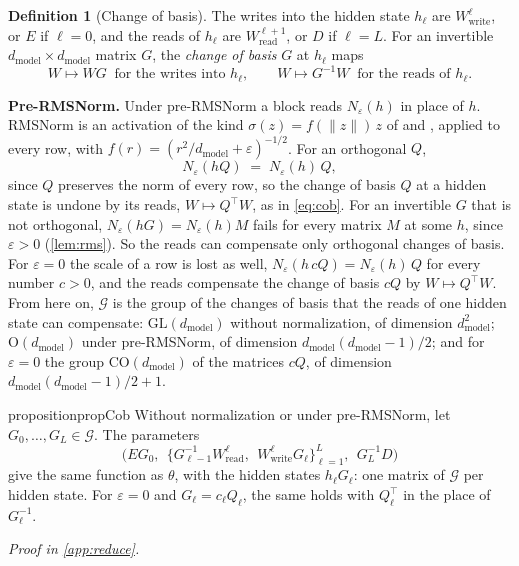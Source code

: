 \documentclass[10pt]{article}
\theoremstyle{definition}
\newtheorem{definition}[theorem]{Definition}
\theoremstyle{remark}
\newcommand{\Wread}{W_{\mathrm{read}}}
\newcommand{\Wwrite}{W_{\mathrm{write}}}
\newcommand{\dm}{d_{\mathrm{model}}}
\newcommand{\GL}{\mathrm{GL}}
\newcommand{\Ort}{\mathrm{O}}
\newcommand{\CO}{\mathrm{CO}}
\newcommand{\G}{\mathcal{G}}
\newcommand{\norm}[1]{\lVert #1\rVert}
\newcommand{\para}[1]{\smallskip\noindent\textbf{#1}\hspace{0.5em}}
\newcommand{\proofin}[1]{\par\vspace{-0.4\baselineskip}\noindent\hfill{\small\itshape Proof in \cref{#1}.}\par\smallskip}
\begin{document}
\begin{definition}[Change of basis]\label{def:cob}
The writes into the hidden state $h_\ell$ are $\Wwrite^{\ell}$, or $E$ if $\ell = 0$, and the reads of $h_\ell$ are $\Wread^{\ell+1}$, or $D$ if $\ell = L$. For an invertible $\dm\times\dm$ matrix $G$, the \emph{change of basis} $G$ at $h_\ell$ maps
\begin{equation}\label{eq:cob}
W \mapsto WG \ \text{ for the writes into } h_\ell, \qquad W \mapsto G^{-1}W \ \text{ for the reads of } h_\ell.
\end{equation}
\end{definition}

\para{Pre-RMSNorm.} Under pre-RMSNorm a block reads $N_\varepsilon(h)$ in place of $h$. RMSNorm is an activation of the kind $\sigma(z) = f(\norm{z})\,z$ of \citet{ganev2021universal} and \citet{zhao2023symmetries}, applied to every row, with $f(r) = (r^2/\dm + \varepsilon)^{-1/2}$. For an orthogonal $Q$,
\[
N_\varepsilon(hQ) \;=\; N_\varepsilon(h)\,Q ,
\]
since $Q$ preserves the norm of every row, so the change of basis $Q$ at a hidden state is undone by its reads, $W \mapsto Q^\top W$, as in \eqref{eq:cob}. For an invertible $G$ that is not orthogonal, $N_\varepsilon(hG) = N_\varepsilon(h)M$ fails for every matrix $M$ at some $h$, since $\varepsilon > 0$ (\cref{lem:rms}). So the reads can compensate only orthogonal changes of basis. For $\varepsilon = 0$ the scale of a row is lost as well, $N_\varepsilon(h\,cQ) = N_\varepsilon(h)\,Q$ for every number $c > 0$, and the reads compensate the change of basis $cQ$ by $W \mapsto Q^\top W$. From here on, $\G$ is the group of the changes of basis that the reads of one hidden state can compensate: $\GL(\dm)$ without normalization, of dimension $\dm^2$; $\Ort(\dm)$ under pre-RMSNorm, of dimension $\dm(\dm-1)/2$; and for $\varepsilon = 0$ the group $\CO(\dm)$ of the matrices $cQ$, of dimension $\dm(\dm-1)/2 + 1$.

\begin{restatable}{proposition}{propCob}\label{prop:cob}
Without normalization or under pre-RMSNorm, let $G_0, \dots, G_L \in \G$. The parameters
\[
\Big(EG_0,\ \ \big\{G_{\ell-1}^{-1}\Wread^{\ell},\ \ \Wwrite^{\ell}G_\ell\big\}_{\ell=1}^{L},\ \ G_L^{-1}D\Big)
\]
give the same function as $\theta$, with the hidden states $h_\ell G_\ell$: one matrix of $\G$ per hidden state. For $\varepsilon = 0$ and $G_\ell = c_\ell Q_\ell$, the same holds with $Q_\ell^\top$ in the place of $G_\ell^{-1}$.
\end{restatable}
\proofin{app:reduce}
\end{document}
